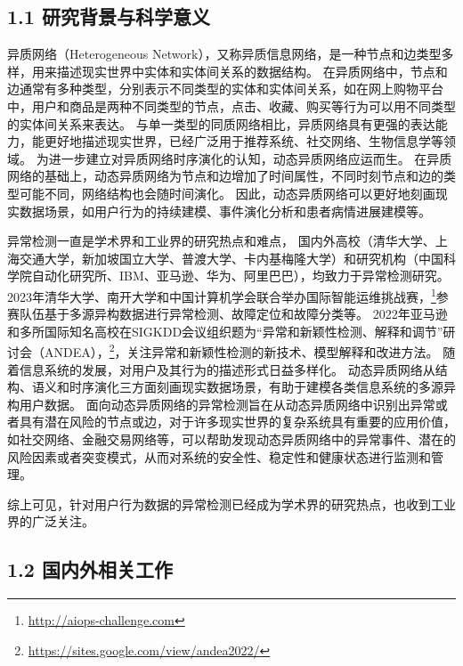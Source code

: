\subsection{\sihao \kaishu \bfseries 1.1 研究背景与科学意义}

异质网络（Heterogeneous Network），又称异质信息网络，是一种节点和边类型多样，用来描述现实世界中实体和实体间关系的数据结构。
在异质网络中，节点和边通常有多种类型，分别表示不同类型的实体和实体间关系，如在网上购物平台中，用户和商品是两种不同类型的节点，点击、收藏、购买等行为可以用不同类型的实体间关系来表达。
与单一类型的同质网络相比，异质网络具有更强的表达能力，能更好地描述现实世界，已经广泛用于推荐系统、社交网络、生物信息学等领域。
为进一步建立对异质网络时序演化的认知，动态异质网络应运而生。
在异质网络的基础上，动态异质网络为节点和边增加了时间属性，不同时刻节点和边的类型可能不同，网络结构也会随时间演化。
因此，动态异质网络可以更好地刻画现实数据场景，如用户行为的持续建模、事件演化分析和患者病情进展建模等。

异常检测一直是学术界和工业界的研究热点和难点，
国内外高校（清华大学、上海交通大学，新加坡国立大学、普渡大学、卡内基梅隆大学）和研究机构（中国科学院自动化研究所、IBM、亚马逊、华为、阿里巴巴），均致力于异常检测研究。
2023年清华大学、南开大学和中国计算机学会联合举办国际智能运维挑战赛，\footnote{\url{http://aiops-challenge.com}}参赛队伍基于多源异构数据进行异常检测、故障定位和故障分类等。
2022年亚马逊和多所国际知名高校在SIGKDD会议组织题为“异常和新颖性检测、解释和调节”研讨会（ANDEA），\footnote{\url{https://sites.google.com/view/andea2022/}}，关注异常和新颖性检测的新技术、模型解释和改进方法。
随着信息系统的发展，对用户及其行为的描述形式日益多样化。
动态异质网络从结构、语义和时序演化三方面刻画现实数据场景，有助于建模各类信息系统的多源异构用户数据。
面向动态异质网络的异常检测旨在从动态异质网络中识别出异常或者具有潜在风险的节点或边，对于许多现实世界的复杂系统具有重要的应用价值，如社交网络、金融交易网络等，可以帮助发现动态异质网络中的异常事件、潜在的风险因素或者突变模式，从而对系统的安全性、稳定性和健康状态进行监测和管理。


综上可见，针对用户行为数据的异常检测已经成为学术界的研究热点，也收到工业界的广泛关注。



\subsection{\sihao \songti \bfseries 1.2 国内外相关工作}


